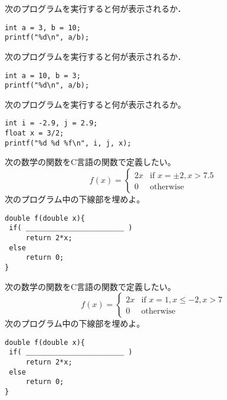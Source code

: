 \documentclass[12pt,a4j]{jarticle}
\newcounter{toi}
\def\toi{%
\bigskip\bigskip\noindent
\addtocounter{toi}{1}
\shadowbox{\bfseries\large 問\thetoi}
\nopagebreak[4]\bigskip\nopagebreak[4]
}
\begin{document}
\toi

次のプログラムを実行すると何が表示されるか．
\begin{verbatim}
int a = 3, b = 10;
printf("%d\n", a/b);
\end{verbatim}





\toi


次のプログラムを実行すると何が表示されるか．
\begin{verbatim}
int a = 10, b = 3;
printf("%d\n", a/b);
\end{verbatim}




\toi



次のプログラムを実行すると何が表示されるか。
\begin{verbatim}
int i = -2.9, j = 2.9;
float x = 3/2;
printf("%d %d %f\n", i, j, x); 
\end{verbatim}






\toi


次の数学の関数をC言語の関数で定義したい。
\[
f(x) = \left\{
\begin{array}{rl}
2x & \mbox{if $x = \pm 2, x > 7.5$}\\
0  & \mbox{otherwise}
\end{array}\right.
\]
次のプログラム中の下線部を埋めよ。
\begin{verbatim}
double f(double x){
 if( ＿＿＿＿＿＿＿＿＿＿＿＿＿＿ )
     return 2*x;
 else
     return 0;
}
\end{verbatim}





\toi

次の数学の関数をC言語の関数で定義したい。
\[
f(x) = \left\{
\begin{array}{rl}
2x & \mbox{if $x=1, x \le -2, x > 7$}\\
0  & \mbox{otherwise}
\end{array}\right.
\]
次のプログラム中の下線部を埋めよ。
\begin{verbatim}
double f(double x){
 if( ＿＿＿＿＿＿＿＿＿＿＿＿＿＿ )
     return 2*x;
 else
     return 0;
}
\end{verbatim}
\end{document}
